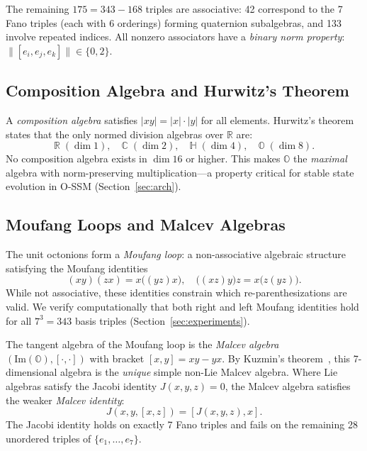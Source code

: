 \documentclass{article}
\newcommand{\Oct}{\mathbb{O}}
\newcommand{\R}{\mathbb{R}}
\newcommand{\C}{\mathbb{C}}
\newcommand{\HH}{\mathbb{H}}
\newcommand{\assoc}[3]{[#1,#2,#3]}
\newcommand{\norm}[1]{\lvert #1 \rvert}
\begin{document}
The remaining $175 = 343 - 168$ triples are associative: 42 correspond to the 7 Fano triples (each with 6 orderings) forming quaternion subalgebras, and 133 involve repeated indices.
All nonzero associators have a \emph{binary norm property}: $\|\assoc{e_i}{e_j}{e_k}\| \in \{0, 2\}$.

\subsection{Composition Algebra and Hurwitz's Theorem}
\label{sec:hurwitz}

A \emph{composition algebra} satisfies $\norm{xy} = \norm{x} \cdot \norm{y}$ for all elements.
Hurwitz's theorem~\cite{hurwitz1898composition} states that the only normed division algebras over $\R$ are:
\begin{equation}
\R \;(\dim 1), \quad \C \;(\dim 2), \quad \HH \;(\dim 4), \quad \Oct \;(\dim 8).
\end{equation}
No composition algebra exists in $\dim 16$ or higher.
This makes $\Oct$ the \emph{maximal} algebra with norm-preserving multiplication---a property critical for stable state evolution in O-SSM (Section~\ref{sec:arch}).

\subsection{Moufang Loops and Malcev Algebras}
\label{sec:moufang}

The unit octonions form a \emph{Moufang loop}: a non-associative algebraic structure satisfying the Moufang identities
\begin{equation}
(xy)(zx) = x\big((yz)x\big), \quad \big((xz)y\big)z = x\big(z(yz)\big).
\end{equation}
While not associative, these identities constrain which re-parenthesizations are valid.
We verify computationally that both right and left Moufang identities hold for all $7^3 = 343$ basis triples (Section~\ref{sec:experiments}).

The tangent algebra of the Moufang loop is the \emph{Malcev algebra} $(\mathrm{Im}(\Oct), [\cdot,\cdot])$ with bracket $[x,y] = xy - yx$.
By Kuzmin's theorem~\cite{kuzmin1968malcev}, this 7-dimensional algebra is the \emph{unique} simple non-Lie Malcev algebra.
Where Lie algebras satisfy the Jacobi identity $J(x,y,z) = 0$, the Malcev algebra satisfies the weaker \emph{Malcev identity}:
\begin{equation}
J(x,y,[x,z]) = [J(x,y,z), x].
\end{equation}
The Jacobi identity holds on exactly 7 Fano triples and fails on the remaining 28 unordered triples of $\{e_1, \ldots, e_7\}$.
\end{document}
